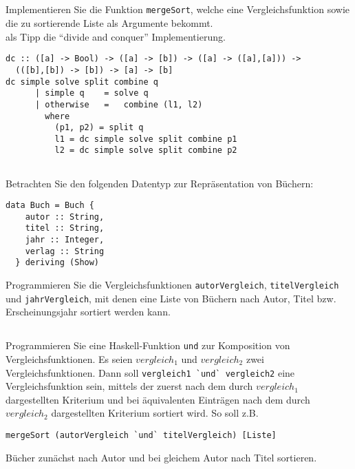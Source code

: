\documentclass[
  10pt,                   %
  DIV12,
  german,                 %
  oneside,                %
  parskip=half,           %
  headings=normal,        %
  captions=tableheading,  %
]{scrartcl}
\begin{document}
\subsection{}
Implementieren Sie die Funktion \lstinline|mergeSort|, welche eine Vergleichsfunktion sowie die zu sortierende Liste als Argumente bekommt.\\
als Tipp die "`divide and conquer"' Implementierung.
\begin{lstlisting}
dc :: ([a] -> Bool) -> ([a] -> [b]) -> ([a] -> ([a],[a])) -> 
  (([b],[b]) -> [b]) -> [a] -> [b]
dc simple solve split combine q 
      | simple q 	= solve q
      | otherwise 	= 	combine (l1, l2)
        where 
          (p1, p2) = split q
          l1 = dc simple solve split combine p1
          l2 = dc simple solve split combine p2	
\end{lstlisting}
\subsection{}
Betrachten Sie den folgenden Datentyp zur Repräsentation von Büchern:
\begin{lstlisting}
data Buch = Buch {
    autor :: String,
    titel :: String,
    jahr :: Integer,
    verlag :: String
  } deriving (Show)
\end{lstlisting}
Programmieren Sie die Vergleichsfunktionen \lstinline|autorVergleich|, \lstinline|titelVergleich| und
\lstinline|jahrVergleich|, mit denen eine Liste von Büchern nach Autor, Titel bzw. Erscheinungsjahr
sortiert werden kann.
\subsection{}
Programmieren Sie eine Haskell-Funktion \lstinline|und| zur Komposition von Vergleichsfunktionen.
Es seien $vergleich_1$ und $vergleich_2$ zwei Vergleichsfunktionen. Dann soll
\lstinline|vergleich1 `und` vergleich2| eine Vergleichsfunktion sein, mittels der zuerst nach dem
durch $vergleich_1$ dargestellten Kriterium und bei äquivalenten Einträgen nach dem
durch $vergleich_2$ dargestellten Kriterium sortiert wird. So soll z.B.
\begin{center}
\lstinline|mergeSort (autorVergleich `und` titelVergleich) [Liste]|
\end{center}
Bücher zunächst nach Autor und bei gleichem Autor nach Titel sortieren.
\end{document}
